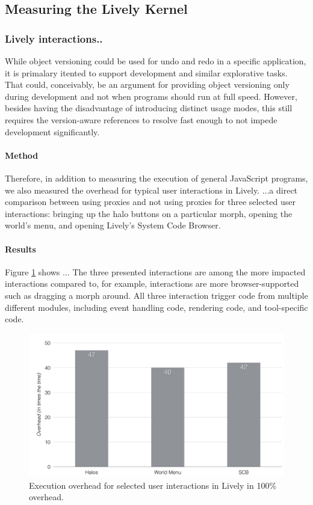 \subsection{Measuring the Lively Kernel}

\subsubsection{Lively interactions..}

While object versioning could be used for undo and redo in a specific application, it is primalary itented to support development and similar explorative tasks.
That could, conceivably, be an argument for providing object versioning only during development and not when programs should run at full speed.
However, besides having the disadvantage of introducing distinct usage modes, this still requires the version-aware references to resolve fast enough to not impede development significantly.

\paragraph{Method}
Therefore, in addition to measuring the execution of general JavaScript programs, we also measured the overhead for typical user interactions in Lively.
...a direct comparison between using proxies and not using proxies for three selected user interactions: bringing up the halo buttons on a particular morph, opening the world's menu, and opening Lively's System Code Browser.


\paragraph{Results}
Figure \ref{fig:LivelyInteractionsOverhead} shows ...
The three presented interactions are among the more impacted interactions compared to, for example, interactions are more browser-supported such as dragging a morph around.
All three interaction trigger code from multiple different modules, including event handling code, rendering code, and tool-specific code.

\begin{figure}[h]
    \centering
    \includegraphics[width=\textwidth]{figures/6_evaluation/3_livelyInteractionsOverhead.pdf}
    \caption{Execution overhead for selected user interactions in Lively in 100\% overhead.}
    \label{fig:LivelyInteractionsOverhead}
\end{figure}


